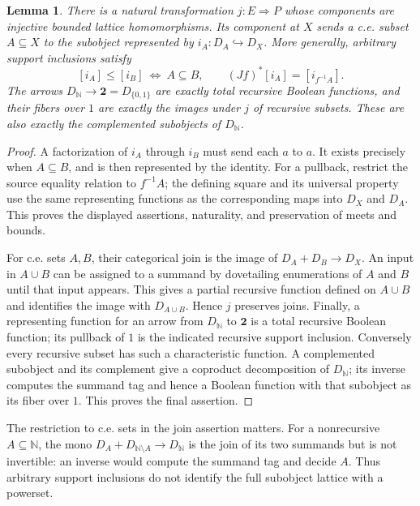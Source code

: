 \documentclass[11pt]{article}
\newtheorem{lemma}[theorem]{Lemma}
\theoremstyle{definition}
\theoremstyle{remark}
\begin{document}
\begin{lemma}\label{lem:integration-numerical-subobjects}
There is a natural transformation $j:E\Rightarrow P$ whose
components are injective bounded lattice homomorphisms. Its
component at $X$ sends a c.e. subset $A\subseteq X$ to the
subobject represented by $i_A:D_A\hookrightarrow D_X$.
More generally, arbitrary support
inclusions satisfy
\[
 [i_A]\leq[i_B]\ \Longleftrightarrow\ A\subseteq B,
 \qquad
 (Jf)^*[i_A]=[i_{f^{-1}A}].
\]
The arrows $D_{\mathbb N}\to\mathbf2=D_{\{0,1\}}$ are exactly
total recursive Boolean functions, and their fibers over $1$ are exactly the
images under $j$ of recursive subsets. These are also exactly
the complemented subobjects of $D_{\mathbb N}$.
\end{lemma}
\begin{proof}
A factorization of $i_A$ through $i_B$ must send each $a$ to $a$.
It exists precisely when $A\subseteq B$, and is then represented by
the identity. For a pullback, restrict the source equality
relation to $f^{-1}A$; the defining square and its universal
property use the same representing functions as the corresponding maps into
$D_X$ and $D_A$. This proves the displayed assertions, naturality,
and preservation of meets and bounds.

For c.e. sets $A,B$, their categorical join is the image of
$D_A+D_B\to D_X$. An input in $A\cup B$ can be assigned to a
summand by dovetailing enumerations of $A$ and $B$ until that
input appears. This gives a partial recursive function defined on $A\cup B$ and
identifies the image with $D_{A\cup B}$. Hence $j$ preserves
joins. Finally, a representing function for an arrow from $D_{\mathbb N}$
to $\mathbf2$ is a total recursive Boolean function; its pullback of $1$ is
the indicated recursive support inclusion. Conversely every
recursive subset has such a characteristic function. A complemented
subobject and its complement give a coproduct decomposition of
$D_{\mathbb N}$; its inverse computes the summand tag and hence
a Boolean function with that subobject as its fiber over $1$. This proves
the final assertion.
\end{proof}

The restriction to c.e. sets in the join assertion matters.
For a nonrecursive $A\subseteq\mathbb N$, the mono
$D_A+D_{\mathbb N\setminus A}\to D_{\mathbb N}$ is the join
of its two summands but is not invertible: an inverse would
compute the summand tag and decide $A$. Thus arbitrary support
inclusions do not identify the full subobject lattice with a
powerset.
\end{document}
